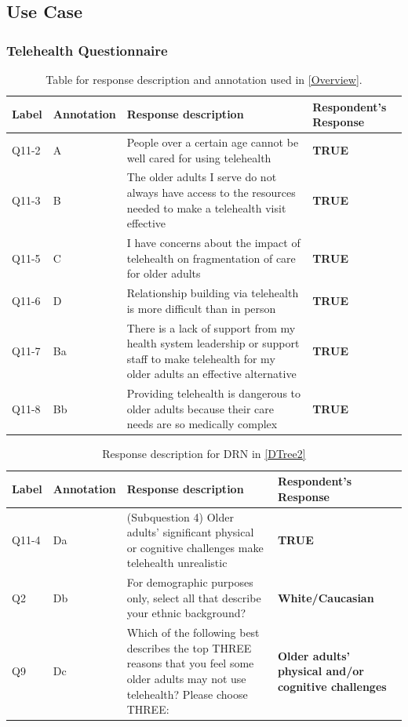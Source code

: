 \subsection{Use Case\label{Use Case}}
\subsubsection{Telehealth Questionnaire\label{Telehealth}}
\begin{table}
    \begin{tabular}[c]{p{0.07\DUtablewidth}p{0.09\DUtablewidth}p{0.6\DUtablewidth}p{0.25\DUtablewidth}}
        \toprule
        \textbf{Label} & \textbf{Annotation} & \textbf{Response description} & \textbf{Respondent's Response}  \\
        \midrule
        Q11-2 & A & People over a certain age cannot be well cared for using telehealth & \textbf{TRUE} \\
        Q11-3 & B & The older adults I serve do not always have access to the resources needed to make a telehealth visit effective & \textbf{TRUE} \\
        Q11-5 & C & I have concerns about the impact of telehealth on fragmentation of care for older adults & \textbf{TRUE} \\
        Q11-6 & D & Relationship building via telehealth is more difficult than in person & \textbf{TRUE} \\
        Q11-7 & Ba & There is a lack of support from my health system leadership or support staff to make telehealth for my older adults an effective alternative & \textbf{TRUE} \\
        Q11-8 & Bb & Providing telehealth is dangerous to older adults because their care needs are so medically complex & \textbf{TRUE} \\
        \bottomrule
    \end{tabular}
    \caption{Table for response description and annotation used in \autoref{Overview}.}
    \label{tab:telehealth1}
\end{table}


\begin{table}
    \begin{tabular}[c]{p{0.07\DUtablewidth}p{0.09\DUtablewidth}p{0.6\DUtablewidth}p{0.25\DUtablewidth}}
        \toprule
        \textbf{Label} & \textbf{Annotation} & \textbf{Response description} & \textbf{Respondent's Response}  \\
        \midrule
        Q11-4&Da&(Subquestion 4) Older adults’ significant physical or cognitive challenges make telehealth unrealistic&\textbf{TRUE}\\
        Q2&Db&For demographic purposes only, select all that describe your ethnic background?&\textbf{White/Caucasian}\\
        Q9&Dc&Which of the following best describes the top THREE reasons that you feel some older adults may not use telehealth? Please choose THREE:&\textbf{Older adults’ physical and/or cognitive challenges}\\
        \bottomrule
    \end{tabular}
    \caption{Response description for DRN in \autoref{DTree2}}
    \label{tab:telehealth2}
\end{table}


